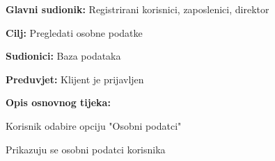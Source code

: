 			\noindent {}
			\begin{packed_item}
				
				\item \textbf{Glavni sudionik:} Registrirani korisnici, zaposlenici, direktor
				\item  \textbf{Cilj:} Pregledati osobne podatke
				\item  \textbf{Sudionici:} Baza podataka
				\item  \textbf{Preduvjet:} Klijent je prijavljen
				\item  \textbf{Opis osnovnog tijeka:}
				
				\item[] \begin{packed_enum}
					
					\item Korisnik odabire opciju "Osobni podatci"
					\item Prikazuju se osobni podatci korisnika
					
				\end{packed_enum}
			\end{packed_item}
			
